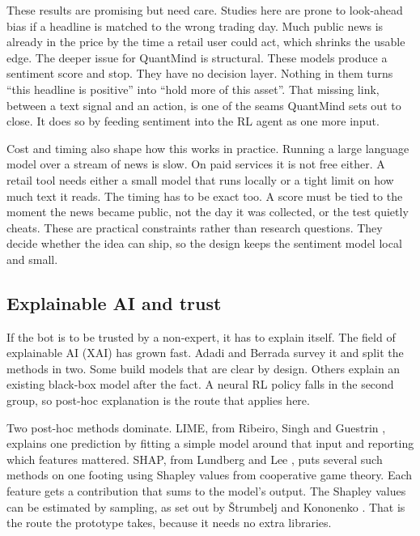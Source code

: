\documentclass[12pt,twoside,letterpaper]{article}
\begin{document}
These results are promising but need care. Studies here are prone to look-ahead bias
if a headline is matched to the wrong trading day. Much public news is already in
the price by the time a retail user could act, which shrinks the usable edge. The
deeper issue for QuantMind is structural. These models produce a sentiment score and
stop. They have no decision layer. Nothing in them turns ``this headline is
positive'' into ``hold more of this asset''. That missing link, between a text
signal and an action, is one of the seams QuantMind sets out to close. It does so by
feeding sentiment into the RL agent as one more input.

Cost and timing also shape how this works in practice. Running a large language
model over a stream of news is slow. On paid services it is not free either. A
retail tool needs either a small model that runs locally or a tight limit on how
much text it reads. The timing has to be exact too. A score must be tied to the moment the
news became public, not the day it was collected, or the test quietly cheats. These
are practical constraints rather than research questions. They decide whether the
idea can ship, so the design keeps the sentiment model local and small.

\subsection{Explainable AI and trust}

If the bot is to be trusted by a non-expert, it has to explain itself. The field of
explainable AI (XAI) has grown fast. Adadi and Berrada \cite{adadi2018} survey it
and split the methods in two. Some build models that are clear by design. Others
explain an existing black-box model after the fact. A neural RL policy falls in the
second group, so post-hoc explanation is the route that applies here.

Two post-hoc methods dominate. LIME, from Ribeiro, Singh and Guestrin
\cite{ribeiro2016}, explains one prediction by fitting a simple model around that
input and reporting which features mattered. SHAP, from Lundberg and Lee
\cite{lundberg2017}, puts several such methods on one footing using Shapley values
from cooperative game theory. Each feature gets a contribution that sums to the
model's output. The Shapley values can be estimated by sampling, as set out by
\v{S}trumbelj and Kononenko \cite{strumbelj2014}. That is the route the prototype
takes, because it needs no extra libraries.
\end{document}
